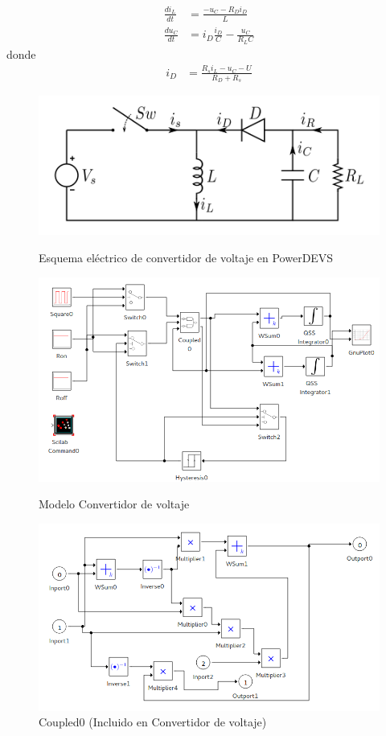 \begin{align*}
\frac{di_{L}}{dt} & = \frac{-u_{C} - R_D i_D }{L}\\
\frac{du_C}{dt} & =i_D \frac{i_D}{C} - \frac{u_C}{R_L C }
\end{align*}
donde
\begin{align*}
i_D & = \frac{R_s i_L - u_C - U }{R_D + R_s}
\end{align*}


\begin{figure}[H]
\centering
 \includegraphics[width=.60\linewidth]{Buckboost_conventions}
 \label{buckdisk-squema}
 \caption{Esquema eléctrico de convertidor de voltaje en PowerDEVS}
\end{figure}

\begin{figure}[H]
\includegraphics[width=0.75\linewidth]{buck_disk}
 \label{model:buckdisk}
\caption{Modelo Convertidor de voltaje}
\end{figure}

\begin{figure}[H]
\includegraphics[width=0.75\linewidth]{buck_disk_coupled0}
\caption{Coupled0 (Incluido en Convertidor de voltaje)}
\label{model:buckdisk_coupled0}
\end{figure}


